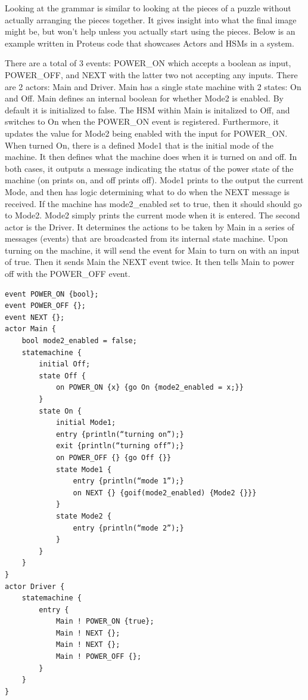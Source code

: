 Looking at the grammar is similar to looking at the pieces of a puzzle without actually arranging the pieces together.
It gives insight into what the final image might be, but won't help unless you actually start using the pieces.
Below is an example written in Proteus code that showcases Actors and HSMs in a system.

There are a total of 3 events: POWER\_ON which accepts a boolean as input, POWER\_OFF, and NEXT with the latter two not accepting any inputs.
There are 2 actors: Main and Driver.
Main has a single state machine with 2 states: On and Off.
Main defines an internal boolean for whether Mode2 is enabled.
By default it is initialized to false.
The HSM within Main is initalized to Off, and switches to On when the POWER\_ON event is registered.
Furthermore, it updates the value for Mode2 being enabled with the input for POWER\_ON.
When turned On, there is a defined Mode1 that is the initial mode of the machine.
It then defines what the machine does when it is turned on and off.
In both cases, it outputs a message indicating the status of the power state of the machine (on prints on, and off prints off).
Mode1 prints to the output the current Mode, and then has logic determining what to do when the NEXT message is received.
If the machine has mode2\_enabled set to true, then it should should go to Mode2.
Mode2 simply prints the current mode when it is entered.
The second actor is the Driver.
It determines the actions to be taken by Main in a series of messages (events) that are broadcasted from its internal state machine.
Upon turning on the machine, it will send the event for Main to turn on with an input of true.
Then it sends Main the NEXT event twice.
It then tells Main to power off with the POWER\_OFF event.

\begin{verbatim}
event POWER_ON {bool};
event POWER_OFF {};
event NEXT {};
actor Main {
    bool mode2_enabled = false;
    statemachine {
        initial Off;
        state Off {
            on POWER_ON {x} {go On {mode2_enabled = x;}}
        }
        state On {
            initial Mode1;
            entry {println(“turning on”);}
            exit {println(“turning off”);}
            on POWER_OFF {} {go Off {}}
            state Mode1 {
                entry {println(“mode 1”);}
                on NEXT {} {goif(mode2_enabled) {Mode2 {}}}
            }
            state Mode2 {
                entry {println(“mode 2”);}
            }
        }
    }
}
actor Driver {
    statemachine {
        entry {
            Main ! POWER_ON {true};
            Main ! NEXT {};
            Main ! NEXT {};
            Main ! POWER_OFF {};
        }
    }
}
\end{verbatim}

